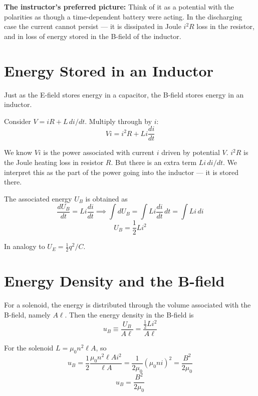 \documentclass[11pt]{report}
\begin{document}
\textbf{The instructor's preferred picture:} Think of it as a potential with the polarities as though a time-dependent battery were acting. In the discharging case the current cannot persist --- it is dissipated in Joule $i^2 R$ loss in the resistor, and in loss of energy stored in the B-field of the inductor.

\section{Energy Stored in an Inductor}

Just as the E-field stores energy in a capacitor, the B-field stores energy in an inductor.

Consider $V = iR + L\,di/dt$. Multiply through by $i$:
\begin{equation}
Vi = i^2 R + Li\frac{di}{dt}
\end{equation}

We know $Vi$ is the power associated with current $i$ driven by potential $V$. $i^2 R$ is the Joule heating loss in resistor $R$. But there is an extra term $L i \, di/dt$. We interpret this as the part of the power going into the inductor --- it is stored there.

The associated energy $U_B$ is obtained as
\begin{equation}
\frac{dU_B}{dt} = Li \frac{di}{dt} \implies \int dU_B = \int Li \frac{di}{dt}\,dt = \int Li \, di
\end{equation}
\begin{equation}
\boxed{U_B = \frac{1}{2}L i^2}
\end{equation}

In analogy to $U_E = \frac{1}{2}q^2/C$.

\section{Energy Density and the B-field}

For a solenoid, the energy is distributed through the volume associated with the B-field, namely $A\ell$. Then the energy density in the B-field is
\begin{equation}
u_B \equiv \frac{U_B}{A\ell} = \frac{\frac{1}{2}Li^2}{A\ell}
\end{equation}

For the solenoid $L = \mu_0 n^2 \ell A$, so
\begin{equation}
u_B = \frac{1}{2}\frac{\mu_0 n^2 \ell A i^2}{\ell A} = \frac{1}{2\mu_0}(\mu_0 n i)^2 = \frac{B^2}{2\mu_0}
\end{equation}
\begin{equation}
\boxed{u_B = \frac{B^2}{2\mu_0}}
\end{equation}
\end{document}
